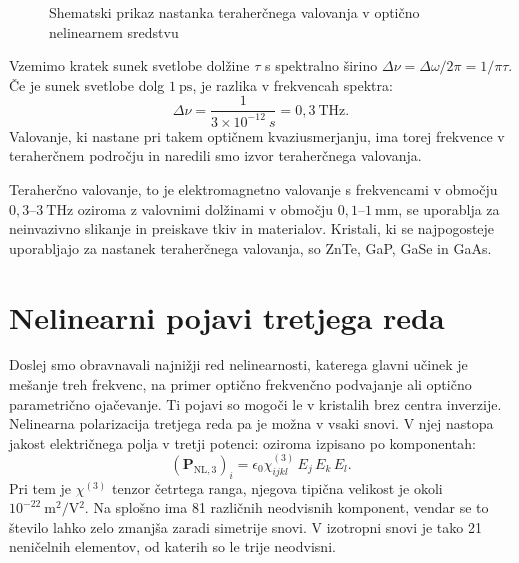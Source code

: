 \begin{figure}[ht]
\centering
\def\svgwidth{90truemm} 

\caption{Shematski prikaz nastanka teraherčnega valovanja v optično nelinearnem sredstvu}
\label{fig:THz}
\end{figure}

Vzemimo kratek sunek svetlobe dolžine $\tau$ s spektralno širino
$\Delta \nu = \Delta \omega/2 \pi = 1/\pi \tau$.
Če je sunek svetlobe dolg $1~\si{\pico\second}$, je razlika v frekvencah 
spektra:
\begin{equation}
\Delta \nu = \frac{1}{3 \times 10^{-12}~\si{s}} = 0,3~\si{\tera\hertz}.
\end{equation}
Valovanje, ki nastane pri takem optičnem kvaziusmerjanju, ima torej frekvence v teraherčnem
področju in naredili smo izvor teraherčnega valovanja. 

Teraherčno valovanje, to je 
elektromagnetno valovanje s frekvencami v območju $0,3$--$3~\si{\tera\hertz}$
oziroma z valovnimi dolžinami v območju $0,1$--$1~\si{\milli\metre}$, 
se uporablja za neinvazivno slikanje in preiskave tkiv in materialov. Kristali, ki 
se najpogosteje uporabljajo za nastanek teraherčnega valovanja, so ZnTe, 
GaP, GaSe in GaAs.  

\section{Nelinearni pojavi tretjega reda}
Doslej smo obravnavali najnižji red nelinearnosti, katerega glavni
učinek je mešanje treh frekvenc, na primer optično frekvenčno podvajanje ali
optično parametrično ojačevanje. Ti pojavi so mogoči le v kristalih brez centra
inverzije. Nelinearna polarizacija tretjega reda pa je možna v vsaki snovi. 
V njej nastopa jakost električnega polja v tretji potenci:
oziroma izpisano po komponentah:
\begin{equation}
\left(\mathbf{P}_{\mathrm{NL,3}}\right)_i= \epsilon_{0}\chi^{(3)}_{ijkl} \,E_j \,E_k\, E_l.
\end{equation}
Pri tem je $\chi^{(3)}$ tenzor četrtega ranga, njegova tipična velikost je okoli 
$10^{-22}~\si{\metre^2/\volt^2}$. Na splošno ima 81 različnih neodvisnih komponent, vendar se to
število lahko zelo zmanjša zaradi simetrije snovi. V izotropni snovi je tako
21 neničelnih elementov, od katerih so le trije neodvisni. 

